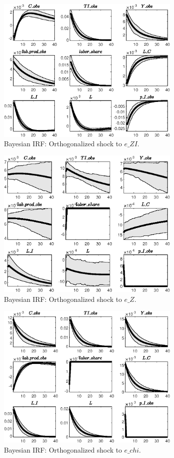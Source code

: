  
\begin{figure}[H]
\centering 
\includegraphics[width=0.80\textwidth]{two_sector_RBC_mobile/Output/two_sector_RBC_mobile_Bayesian_IRF_e_ZI_1}
\caption{Bayesian IRF: Orthogonalized shock to $e\_ZI$.}
\label{Fig:BayesianIRF:e_ZI:1}
\end{figure}
 
\begin{figure}[H]
\centering 
\includegraphics[width=0.80\textwidth]{two_sector_RBC_mobile/Output/two_sector_RBC_mobile_Bayesian_IRF_e_Z_1}
\caption{Bayesian IRF: Orthogonalized shock to $e\_Z$.}
\label{Fig:BayesianIRF:e_Z:1}
\end{figure}
 
\begin{figure}[H]
\centering 
\includegraphics[width=0.80\textwidth]{two_sector_RBC_mobile/Output/two_sector_RBC_mobile_Bayesian_IRF_e_chi_1}
\caption{Bayesian IRF: Orthogonalized shock to $e\_chi$.}
\label{Fig:BayesianIRF:e_chi:1}
\end{figure}
 
